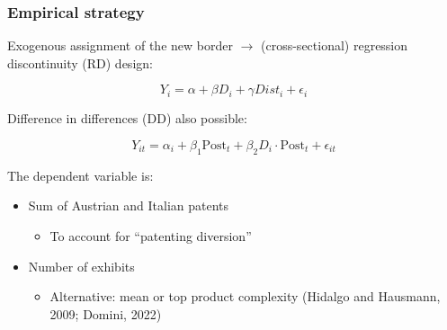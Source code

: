 \documentclass[10pt]{beamer}
\begin{document}
\begin{frame}
    \frametitle{Empirical strategy}
    
    Exogenous assignment of the new border $\rightarrow$ (cross-sectional) regression discontinuity (RD) design:    

    \begin{equation*}
        Y_{i} = \alpha + \beta D_i + \gamma Dist_i + \epsilon_i 
    \end{equation*}

    \bigskip
    
    Difference in differences (DD) also possible:

    \begin{equation*}
        Y_{it} = \alpha_i + \beta_1 \text{Post}_t + \beta_2 D_i \cdot \text{Post}_t + \epsilon_{it}
    \end{equation*}

    \bigskip

    The dependent variable is:

    \begin{itemize}
    
        \item Sum of Austrian and Italian patents
        \begin{itemize}
            \item To account for ``patenting diversion''
        \end{itemize}

        \item Number of exhibits
        \begin{itemize}
            \item Alternative: mean or top product complexity (Hidalgo and Hausmann, 2009; Domini, 2022) 
        \end{itemize}
    
    \end{itemize}
    
    \bigskip

\end{frame}
\end{document}
